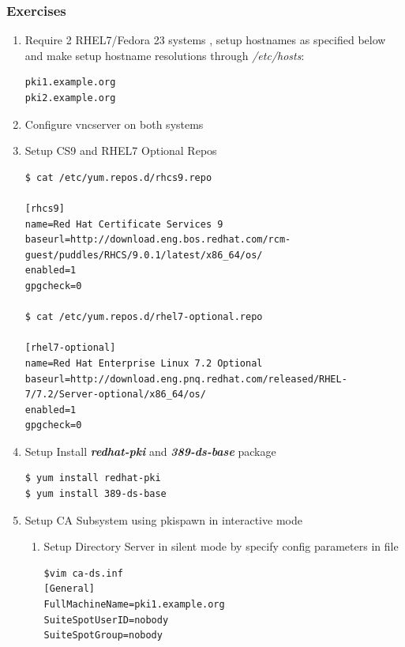 \documentclass[a4paper]{article}
\begin{document}
\subsubsection{Exercises}
    \begin{enumerate}[label*=\arabic*.]
        \item \label{setup1} Require 2 RHEL7/Fedora 23 systems , setup hostnames as specified below and make setup hostname
            resolutions through \textit{/etc/hosts}:
            \begin{lstlisting}
pki1.example.org
pki2.example.org
            \end{lstlisting}
        \item \label{setup2} Configure vncserver on both systems
        \item \label{setup3} Setup CS9 and RHEL7 Optional Repos
            \begin{lstlisting}[style=BashInputStyle]
$ cat /etc/yum.repos.d/rhcs9.repo

[rhcs9]
name=Red Hat Certificate Services 9
baseurl=http://download.eng.bos.redhat.com/rcm-guest/puddles/RHCS/9.0.1/latest/x86_64/os/
enabled=1   
gpgcheck=0

$ cat /etc/yum.repos.d/rhel7-optional.repo

[rhel7-optional]
name=Red Hat Enterprise Linux 7.2 Optional
baseurl=http://download.eng.pnq.redhat.com/released/RHEL-7/7.2/Server-optional/x86_64/os/
enabled=1
gpgcheck=0
            \end{lstlisting}

        \item \label{setup4} Setup Install \textbf{\textit{redhat-pki}} and \textbf{\textit{389-ds-base}} package 

            \begin{lstlisting}[style=BashInputStyle]
$ yum install redhat-pki
$ yum install 389-ds-base
            \end{lstlisting}
        
        \item \label{rootca} Setup CA Subsystem using pkispawn in interactive mode
            \begin{enumerate}[label*=\arabic*.]
                \item \label{ds1} Setup Directory Server in silent mode by specify config parameters in file 
                    \begin{lstlisting}[style=bashInputStyle]
$vim ca-ds.inf
[General]
FullMachineName=pki1.example.org 
SuiteSpotUserID=nobody
SuiteSpotGroup=nobody


\end{lstlisting}
\end{enumerate}
\end{enumerate}
\end{document}
